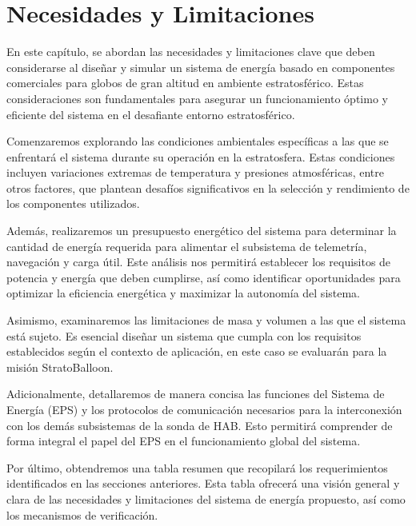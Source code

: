 \chapter{Necesidades y Limitaciones}
En este capítulo, se abordan las necesidades y limitaciones clave que deben considerarse al diseñar y simular un sistema de energía basado en componentes comerciales para globos de gran altitud en ambiente estratosférico. Estas consideraciones son fundamentales para asegurar un funcionamiento óptimo y eficiente del sistema en el desafiante entorno estratosférico. 

\hspace{1.27cm}Comenzaremos explorando las condiciones ambientales específicas a las que se enfrentará el sistema durante su operación en la estratosfera. Estas condiciones incluyen variaciones extremas de temperatura y presiones atmosféricas, entre otros factores, que plantean desafíos significativos en la selección y rendimiento de los componentes utilizados.

\hspace{1.27cm}Además, realizaremos un presupuesto energético del sistema para determinar la cantidad de energía requerida para alimentar el subsistema de telemetría, navegación y carga útil. Este análisis nos permitirá establecer los requisitos de potencia y energía que deben cumplirse, así como identificar oportunidades para optimizar la eficiencia energética y maximizar la autonomía del sistema.

\hspace{1.27cm}Asimismo, examinaremos las limitaciones de masa y volumen a las que el sistema está sujeto. Es esencial diseñar un sistema que cumpla con los requisitos establecidos según el contexto de aplicación, en este caso se evaluarán para la misión StratoBalloon.

\hspace{1.27cm}Adicionalmente, detallaremos de manera concisa las funciones del Sistema de Energía (EPS) y los protocolos de comunicación necesarios para la interconexión con los demás subsistemas de la sonda de HAB. Esto permitirá comprender de forma integral el papel del EPS en el funcionamiento global del sistema.

\hspace{1.27cm}Por último, obtendremos una tabla resumen que recopilará los requerimientos identificados en las secciones anteriores. Esta tabla ofrecerá una visión general y clara de las necesidades y limitaciones del sistema de energía propuesto, así como los mecanismos de verificación.



